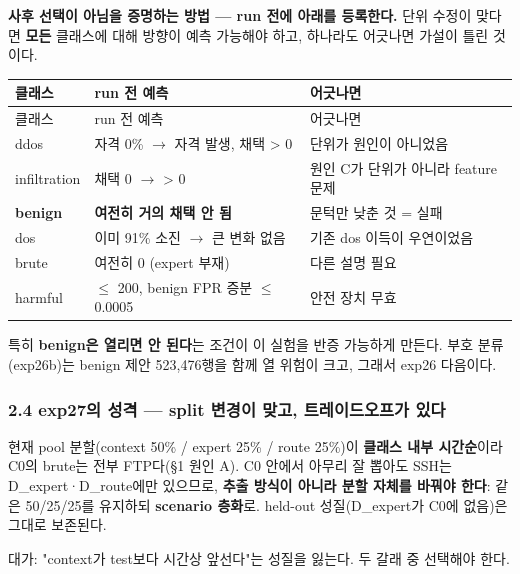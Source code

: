 \textbf{사후 선택이 아님을 증명하는 방법 — run 전에 아래를 등록한다.} 단위 수정이 맞다면 \textbf{모든} 클래스에 대해 방향이 예측 가능해야 하고, 하나라도 어긋나면 가설이 틀린 것이다.

\begingroup
\footnotesize
\begin{longtable}{>{\raggedright\arraybackslash}p{}>{\raggedright\arraybackslash}p{}>{\raggedright\arraybackslash}p{}}
\toprule
클래스 & run 전 예측 & 어긋나면 \\ \midrule
\endfirsthead
클래스 & run 전 예측 & 어긋나면 \\ \midrule
\endhead
{}ddos & 자격 0\%  \ensuremath{\rightarrow}  자격 발생, 채택 > 0 & 단위가 원인이 아니었음 \\
{}infiltration & 채택 0  \ensuremath{\rightarrow}  > 0 & 원인 C가 단위가 아니라 feature 문제 \\
{}\textbf{benign} & \textbf{여전히 거의 채택 안 됨} & 문턱만 낮춘 것 =\allowbreak{} 실패 \\
{}dos & 이미 91\% 소진  \ensuremath{\rightarrow}  큰 변화 없음 & 기존 dos 이득이 우연이었음 \\
{}brute & 여전히 0 (expert 부재) & 다른 설명 필요 \\
{}harmful & \ensuremath{\leq} 200, benign FPR 증분 \ensuremath{\leq} 0.0005 & 안전 장치 무효 \\
\bottomrule
\end{longtable}
\endgroup
특히 \textbf{benign은 열리면 안 된다}는 조건이 이 실험을 반증 가능하게 만든다. 부호 분류(exp26b)는 benign 제안 523,476행을 함께 열 위험이 크고, 그래서 exp26 다음이다.

\subsubsection{2.4 exp27의 성격 — split 변경이 맞고, 트레이드오프가 있다}
현재 pool 분할(context 50\% /\allowbreak{} expert 25\% /\allowbreak{} route 25\%)이 \textbf{클래스 내부 시간순}이라 C0의 brute는 전부 FTP다(§1 원인 A). C0 안에서 아무리 잘 뽑아도 SSH는 D\_\allowbreak{}expert·D\_\allowbreak{}route에만 있으므로, \textbf{추출 방식이 아니라 분할 자체를 바꿔야 한다}: 같은 50/\allowbreak{}25/\allowbreak{}25를 유지하되 \textbf{scenario 층화}로. held-out 성질(D\_\allowbreak{}expert가 C0에 없음)은 그대로 보존된다.

대가: "context가 test보다 시간상 앞선다"는 성질을 잃는다. 두 갈래 중 선택해야 한다.

